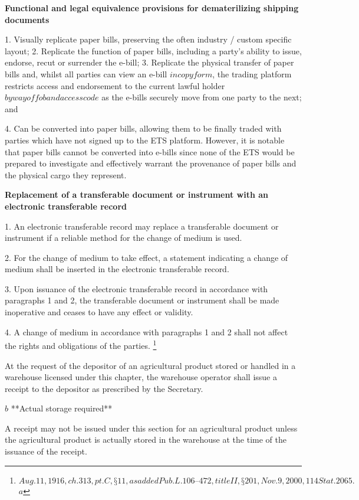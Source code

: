 \documentclass{article}
\begin{document}
\textbf{Functional and legal equivalence provisions for dematerilizing shipping documents}

1. Visually replicate paper bills, preserving the often industry / custom specific layout;
2. Replicate the function of paper bills, including a party’s ability to issue, endorse, recut or surrender the e-bill;
3. Replicate the physical transfer of paper bills and, whilst all parties can view an e-bill \(in copy form\), the trading platform restricts access and endorsement to the current lawful holder \(by way of fob and access code\) as the e-bills securely move from one party to the next; and

4. Can be converted into paper bills, allowing them to be finally traded with parties which have not signed up to the ETS platform. However, it is notable that paper bills cannot be converted into e-bills since none of the ETS would be prepared to investigate and effectively warrant the provenance of paper bills and the physical cargo they represent.

 \textbf{Replacement of a transferable document or instrument with an electronic transferable record}

1. An electronic transferable record may replace a transferable document or instrument if a reliable method for the change of medium is used.

2. For the change of medium to take effect, a statement indicating a change of medium shall be inserted in the electronic transferable record.

3. Upon issuance of the electronic transferable record in accordance with paragraphs 1 and 2, the transferable document or instrument shall be made inoperative and ceases to have any effect or validity.

4. A change of medium in accordance with paragraphs 1 and 2 shall not affect the rights and obligations of the parties.
\footnote{\(Aug. 11, 1916, ch. 313, pt. C, § 11, as added Pub. L. 106–472, title II, § 201, Nov. 9, 2000, 114 Stat. 2065.\) \(a\) }


At the request of the depositor of an agricultural product stored or handled in a warehouse licensed under this chapter, the warehouse operator shall issue a receipt to the depositor as prescribed by the Secretary.

\(b\) **Actual storage required**

A receipt may not be issued under this section for an agricultural product unless the agricultural product is actually stored in the warehouse at the time of the issuance of the receipt.
\end{document}
